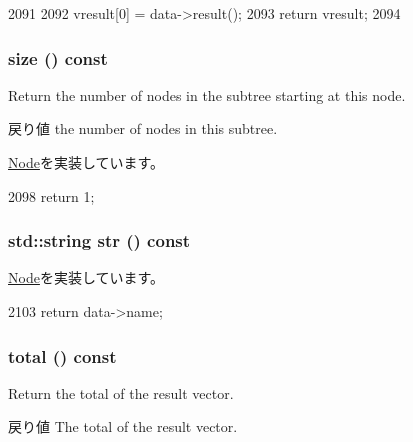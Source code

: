 \begin{DoxyCode}
2091     {
2092         vresult[0] = data->result();
2093         return vresult;
2094     }
\end{DoxyCode}
\hypertarget{classStats_1_1ScalarStatNode_a503ab01f6c0142145d3434f6924714e7}{
\subsubsection[{size}]{ size () const}}
\label{classStats_1_1ScalarStatNode_a503ab01f6c0142145d3434f6924714e7}
Return the number of nodes in the subtree starting at this node. \begin{DoxyReturn}{戻り値}
the number of nodes in this subtree. 
\end{DoxyReturn}


\hyperlink{classStats_1_1Node_a4051d143efd31726fa13df03ae4e1bce}{Node}を実装しています。


\begin{DoxyCode}
2098 { return 1; }
\end{DoxyCode}
\hypertarget{classStats_1_1ScalarStatNode_a1b9b8885b0880fc4ddf9a2c7d1ca3dc4}{
\subsubsection[{str}]{\setlength{\rightskip}{0pt plus 5cm}std::string str () const}}
\label{classStats_1_1ScalarStatNode_a1b9b8885b0880fc4ddf9a2c7d1ca3dc4}


\hyperlink{classStats_1_1Node_a6522bc65bd97a6b1ef6cdfe78462a919}{Node}を実装しています。


\begin{DoxyCode}
2103 { return data->name; }
\end{DoxyCode}
\hypertarget{classStats_1_1ScalarStatNode_a35c6e2ed3fc81b40d69052a062113ead}{
\subsubsection[{total}]{ total () const}}
\label{classStats_1_1ScalarStatNode_a35c6e2ed3fc81b40d69052a062113ead}
Return the total of the result vector. \begin{DoxyReturn}{戻り値}
The total of the result vector. 
\end{DoxyReturn}


